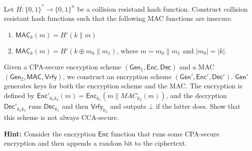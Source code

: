 \documentclass[a4paper,10pt,landscape,twocolumn]{scrartcl}
\begin{document}
\begin{exercise}[HMAC?]
  Let $H: \{0,1\}^*\to \{0,1\}^n$ be a collision resistand hash function. Construct collision resistant hash functions such that the following MAC functions are insecure.
  \begin{enumerate}
  	\item $\mathsf{MAC}_k(m)=H'(k\|m)$
  	\item $\mathsf{MAC}_k(m)=H'(k\oplus m_0\|m_1)$, where $m=m_0\|m_1$ and $|m_0|=|k|$.
  \end{enumerate}
\end{exercise}

\begin{exercise}

Given a CPA-secure encryption scheme $(\mathsf{Gen}_1, \mathsf{Enc}, \mathsf{Dec})$ and a MAC $(\mathsf{Gen}_2, \mathsf{MAC}, \mathsf{Vrfy})$, we construct an encryption scheme $(\mathsf{Gen}', \mathsf{Enc}', \mathsf{Dec}')$. $\mathsf{Gen}'$ generates keys for both the encryption scheme and the MAC. The encryption is defined by $\mathsf{Enc}'_{k_1k_2}(m)=\mathsf{Enc}_{k_1}(m\|MAC_{k_2}(m))$, and the decryption $\mathsf{Dec}'_{k_1k_2}$ runs $\mathsf{Dec}_{k_1}$ and then $\mathsf{Vrfy}_{k_2}$ and outputs $\bot$ if the latter does. Show that this scheme is not always CCA-secure.

\textbf{Hint:} Consider the encryption $\mathsf{Enc}$ function that runs some CPA-secure encryption and then appends a random bit to the ciphertext.

\end{exercise}

%
\end{document}
